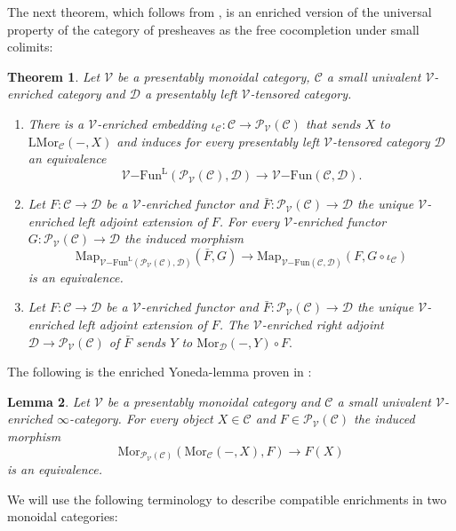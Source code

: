 \documentclass[10pt,oneside]{article}
\numberwithin{equation}{section} %
\numberwithin{figure}{section} %
\theoremstyle{plain}
\newtheorem{theorem}{Theorem}[subsection]
\newtheorem{lemma}[theorem]{Lemma}
\theoremstyle{definition}
\newcommand{\mC}{{\mathcal C}}
\newcommand{\mD}{{\mathcal D}}
\newcommand{\mP}{{\mathcal P}}
\newcommand{\mV}{{\mathcal V}}
\renewcommand{\L}{{\mathrm L}}
\newcommand{\Fun}{\mathrm{Fun}}
\newcommand{\Map}{{\mathrm{Map}}}
\newcommand{\Mor}{{\mathrm{Mor}}}
\begin{document}
The next theorem, which follows from \cite[Theorem 3.41, Theorem 4.70]{heine2024bienriched}, is an enriched version of the universal property of the category of presheaves as the free cocompletion under small colimits:

\begin{theorem}
\label{Yonedaext}
Let $\mV$ be a presentably monoidal category, $\mC$ a small univalent $\mV$-enriched category and $\mD$ a presentably left $\mV$-tensored category.
\begin{enumerate}[\normalfont(1)]\setlength{\itemsep}{-2pt}
\item There is a $\mV$-enriched embedding $\iota_\mC : \mC \to \mP_\mV(\mC)$ that sends $X$ to $\L\Mor_\mC(-,X)$ and induces
for every presentably left $\mV$-tensored category $\mD$ an equivalence
$$ {\mV\mathrm{-}\Fun^\L}(\mP_\mV(\mC),\mD)\to \mV\mathrm{-}\Fun(\mC,\mD).$$
\item Let $F: \mC \to \mD$ be a $\mV$-enriched functor and
$\bar{F}: \mP_\mV(\mC) \to \mD $ the unique $\mV$-enriched left adjoint extension of $F$.
For every $\mV$-enriched functor $G: \mP_\mV(\mC) \to \mD $
the induced morphism $$\Map_{{\mV\mathrm{-}\Fun^\L}(\mP_\mV(\mC),\mD)}(\bar{F},G) \to \Map_{\mV\mathrm{-}\Fun(\mC,\mD)}(F,G \circ \iota_\mC) $$ is an equivalence.
\item Let $F: \mC \to \mD$ be a $\mV$-enriched functor and
$\bar{F}: \mP_\mV(\mC) \to \mD $ the unique $\mV$-enriched left adjoint extension of $F$.
The $\mV$-enriched right adjoint $\mD \to \mP_\mV(\mC)$ of $\bar{F}$ sends $Y$ to $\Mor_\mD(-,Y) \circ F. $
\end{enumerate}
\end{theorem}

The following is the enriched Yoneda-lemma proven in 
\cite[Corollary 4.44]{heine2024bienriched}:

\begin{lemma}
Let $\mV$ be a presentably monoidal category and $\mC$ a small univalent $\mV$-enriched $\infty$-category. For every object $X \in \mC$ and $F \in \mP_\mV(\mC)$ the induced morphism $$\Mor_{\mP_\mV(\mC)}(\Mor_\mC(-,X),F) \to F(X) $$ is an equivalence.

\end{lemma}

We will use the following terminology to describe compatible enrichments in two monoidal categories:
\end{document}
